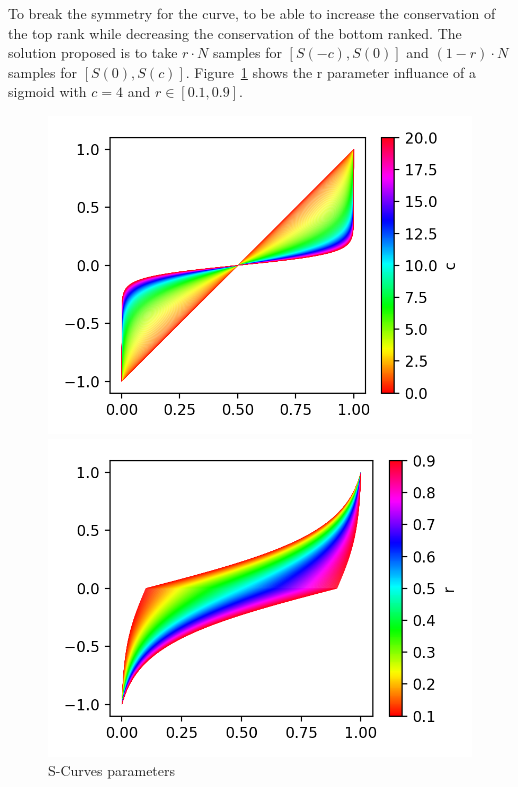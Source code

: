 To break the symmetry for the curve, to be able to increase the conservation of the top rank while decreasing the conservation of the bottom ranked.
The solution proposed is to take $r \cdot N$ samples for $\left[S(-c), S(0)\right]$ and $(1-r) \cdot N$ samples for $\left[S(0), S(c)\right]$.
Figure~\ref{fig:s_curve_r} shows the r parameter influance of a sigmoid with $c = 4$ and $r \in \left[0.1, 0.9\right]$.

\begin{figure}
  \centering
  \caption{S-Curves parameters}
  \label{fig:s_curve_params}

  \label{fig:s_curve_c}
  \includegraphics[width=\linewidth]{img/s_curve_c.png}

  \label{fig:s_curve_r}
  \includegraphics[width=\linewidth]{img/s_curve_r.png}
\end{figure}

